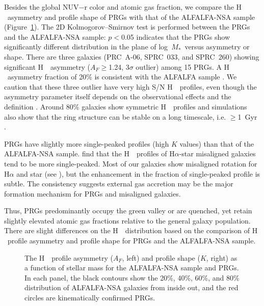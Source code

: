 \documentclass[twocolumn]{aastex631}
\newcommand{\mstar}{$M_{*}$}
\def\HI{H\,  {\textsc{\romannumeral 1}}}
\begin{document}
Besides the global NUV$-$r color and atomic gas fraction, we compare the \HI\ asymmetry and profile shape of PRGs with that of the ALFALFA-NSA sample (Figure~\ref{fig:hi-distribution}). The 2D Kolmogorov--Smirnov test is performed between the PRGs and the ALFALFA-NSA sample: $p<$0.05 indicates that the PRGs show significantly different distribution in the plane of log~\mstar\ versus asymmetry or shape. There are three galaxies (PRC~A-06, SPRC~033, and SPRC~260) showing significant \HI\ asymmetry ($A_F\geq$1.24, 3$\sigma$ outlier) among 15 PRGs. A \HI\ asymmetry fraction of 20\% is consistent with the ALFALFA sample \citep{Yu2022ApJS..261...21Y}. We caution that these three outlier have very high S/N \HI\ profiles, even though the asymmetry parameter itself depends on the observational effects and the definition \citep{Deg2020MNRAS.495.1984D}. Around 80\% galaxies show symmetric \HI\ profiles and simulations also show that the ring structure can be stable on a long timescale, i.e. $\geq$1~Gyr \citep{Smirnov2024MNRAS.527.4112S}. 

PRGs have slightly more single-peaked profiles (high $K$ values) than that of the ALFALFA-NSA sample. \citet{Zhang2025ApJ...993..149Z} find that the \HI\ profiles of H$\alpha$-star misaligned galaxies tend to be more single-peaked. Most of our galaxies show misaligned rotation for H$\alpha$ and star (see \citealt{Moiseev2011MNRAS.418..244M}), but the enhancement in the fraction of single-peaked profile is subtle. The consistency suggests external gas accretion may be the major formation mechanism for PRGs and misaligned galaxies.

Thus, PRGs predominantly occupy the green valley or are quenched, yet retain slightly elevated atomic gas fractions relative to the general galaxy population. There are slight differences on the \HI\ distribution based on the comparison of \HI\ profile asymmetry and profile shape for PRGs and the ALFALFA-NSA sample.


\begin{figure}
\caption{
The \HI\ profile asymmetry ($A_F$, left) and profile shape ($K$, right) as a function of stellar mass for the ALFALFA-NSA sample and PRGs. In each panel, the black contours show the 20\%, 40\%, 60\%, and 80\% distribution of ALFALFA-NSA galaxies from inside out, and the red circles are kinematically confirmed PRGs. 
}
\label{fig:hi-distribution}
\end{figure}
\end{document}
